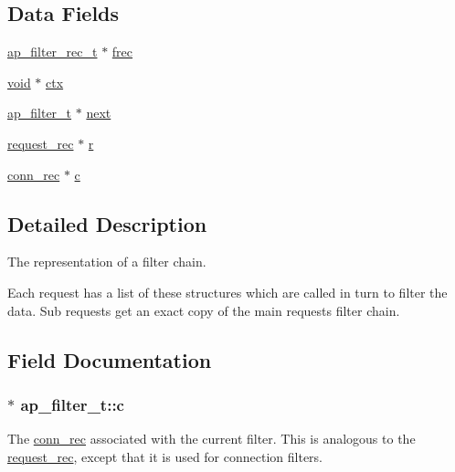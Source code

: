 \subsection*{Data Fields}
\begin{DoxyCompactItemize}
\item 
\hyperlink{structap__filter__rec__t}{ap\+\_\+filter\+\_\+rec\+\_\+t} $\ast$ \hyperlink{structap__filter__t_a8eb5e0c9ade0302a2d024f01d70e9c07}{frec}
\item 
\hyperlink{group__MOD__ISAPI_gacd6cdbf73df3d9eed42fa493d9b621a6}{void} $\ast$ \hyperlink{structap__filter__t_aef5a2ef40157f704d2b573b8737a6a70}{ctx}
\item 
\hyperlink{structap__filter__t}{ap\+\_\+filter\+\_\+t} $\ast$ \hyperlink{structap__filter__t_af4835ed2c41734061dc374d92ba401a2}{next}
\item 
\hyperlink{structrequest__rec}{request\+\_\+rec} $\ast$ \hyperlink{structap__filter__t_a2d6537780c4059697c1f168a1121d62c}{r}
\item 
\hyperlink{structconn__rec}{conn\+\_\+rec} $\ast$ \hyperlink{structap__filter__t_afb039953f0c62d8455aa9f4bdd3ef487}{c}
\end{DoxyCompactItemize}


\subsection{Detailed Description}
The representation of a filter chain. 

Each request has a list of these structures which are called in turn to filter the data. Sub requests get an exact copy of the main requests filter chain. 

\subsection{Field Documentation}
\subsubsection[{\texorpdfstring{c}{c}}]{$\ast$ ap\+\_\+filter\+\_\+t\+::c}\hypertarget{structap__filter__t_afb039953f0c62d8455aa9f4bdd3ef487}{}\label{structap__filter__t_afb039953f0c62d8455aa9f4bdd3ef487}
The \hyperlink{structconn__rec}{conn\+\_\+rec} associated with the current filter. This is analogous to the \hyperlink{structrequest__rec}{request\+\_\+rec}, except that it is used for connection filters. 
